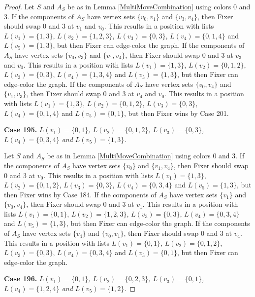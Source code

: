 \documentclass[12pt]{amsart}
\theoremstyle{plain}
\theoremstyle{definition}
\theoremstyle{remark}
\begin{document}
\begin{proof}
Let $S$ and $A_S$ be as in Lemma \ref{MultiMoveCombination} using colors $0$ and $3$. If the components of $A_S$ have vertex sets $\{v_0, v_1\}$ and $\{v_3, v_4\}$, then Fixer should swap 0 and 3 at $v_1$ and $v_0$. This results in a position with lists $L(v_1) = \{1, 3\}$, $L(v_2) = \{1, 2, 3\}$, $L(v_3) = \{0, 3\}$, $L(v_4) = \{0, 1, 4\}$ and $L(v_5) = \{1, 3\}$, but then Fixer can edge-color the graph.
If the components of $A_S$ have vertex sets $\{v_0, v_3\}$ and $\{v_1, v_4\}$, then Fixer should swap 0 and 3 at $v_3$ and $v_0$. This results in a position with lists $L(v_1) = \{1, 3\}$, $L(v_2) = \{0, 1, 2\}$, $L(v_3) = \{0, 3\}$, $L(v_4) = \{1, 3, 4\}$ and $L(v_5) = \{1, 3\}$, but then Fixer can edge-color the graph.
If the components of $A_S$ have vertex sets $\{v_0, v_4\}$ and $\{v_1, v_3\}$, then Fixer should swap 0 and 3 at $v_4$ and $v_0$. This results in a position with lists $L(v_1) = \{1, 3\}$, $L(v_2) = \{0, 1, 2\}$, $L(v_3) = \{0, 3\}$, $L(v_4) = \{0, 1, 4\}$ and $L(v_5) = \{0, 1\}$, but then Fixer wins by Case 201.

\noindent\textbf{Case 195.  }\textit{$L(v_1) = \{0, 1\}$, $L(v_2) = \{0, 1, 2\}$, $L(v_3) = \{0, 3\}$, $L(v_4) = \{0, 3, 4\}$ and $L(v_5) = \{1, 3\}$.}

Let $S$ and $A_S$ be as in Lemma \ref{MultiMoveCombination} using colors $0$ and $3$. If the components of $A_S$ have vertex sets $\{v_0\}$ and $\{v_1, v_4\}$, then Fixer should swap 0 and 3 at $v_0$. This results in a position with lists $L(v_1) = \{1, 3\}$, $L(v_2) = \{0, 1, 2\}$, $L(v_3) = \{0, 3\}$, $L(v_4) = \{0, 3, 4\}$ and $L(v_5) = \{1, 3\}$, but then Fixer wins by Case 184.
If the components of $A_S$ have vertex sets $\{v_1\}$ and $\{v_0, v_4\}$, then Fixer should swap 0 and 3 at $v_1$. This results in a position with lists $L(v_1) = \{0, 1\}$, $L(v_2) = \{1, 2, 3\}$, $L(v_3) = \{0, 3\}$, $L(v_4) = \{0, 3, 4\}$ and $L(v_5) = \{1, 3\}$, but then Fixer can edge-color the graph.
If the components of $A_S$ have vertex sets $\{v_4\}$ and $\{v_0, v_1\}$, then Fixer should swap 0 and 3 at $v_4$. This results in a position with lists $L(v_1) = \{0, 1\}$, $L(v_2) = \{0, 1, 2\}$, $L(v_3) = \{0, 3\}$, $L(v_4) = \{0, 3, 4\}$ and $L(v_5) = \{0, 1\}$, but then Fixer can edge-color the graph.

\noindent\textbf{Case 196.  }\textit{$L(v_1) = \{0, 1\}$, $L(v_2) = \{0, 2, 3\}$, $L(v_3) = \{0, 1\}$, $L(v_4) = \{1, 2, 4\}$ and $L(v_5) = \{1, 2\}$.}


\end{proof}
\end{document}
